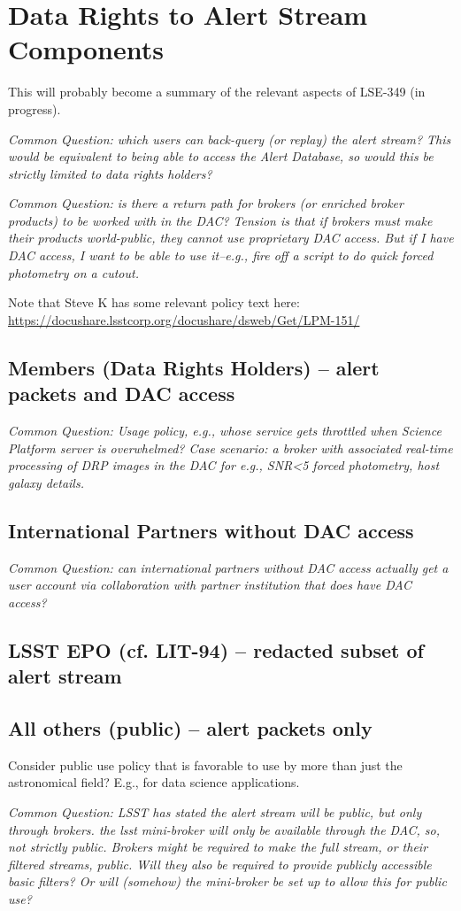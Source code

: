 \section{Data Rights to Alert Stream Components}\label{sec:data_rights}

This will probably become a summary of the relevant aspects of LSE-349 (in progress). 

{\it Common Question: which users can back-query (or replay) the alert stream? This would be equivalent to being able to access the Alert Database, so would this be strictly limited to data rights holders?}

{\it Common Question: is there a return path for brokers (or enriched broker products) to be worked with in the DAC?  Tension is that if brokers must make their products world-public, they cannot use proprietary DAC access.  But if I have DAC access, I want to be able to use it--e.g., fire off a script to do quick forced photometry on a cutout.}

Note that Steve K has some relevant policy text here:
\url{https://docushare.lsstcorp.org/docushare/dsweb/Get/LPM-151/}


\subsection{Members (Data Rights Holders) -- alert packets and DAC access}

{\it Common Question: Usage policy, e.g., whose service gets throttled when Science Platform server is overwhelmed? Case scenario: a broker with associated real-time processing of DRP images in the DAC for e.g., SNR<5 forced photometry, host galaxy details.}

\subsection{International Partners without DAC access}

{\it Common Question: can international partners without DAC access actually get a user account via collaboration with partner institution that does have DAC access?}

\subsection{LSST EPO (cf. LIT-94) -- redacted subset of alert stream}

\subsection{All others (public) -- alert packets only}

Consider public use policy that is favorable to use by more than just the astronomical field? E.g., for data science applications.

{\it Common Question: LSST has stated the alert stream will be public, but only through brokers. the lsst mini-broker will only be available through the DAC, so, not strictly public. Brokers might be required to make the full stream, or their filtered streams, public. Will they also be required to provide publicly accessible basic filters? Or will (somehow) the mini-broker be set up to allow this for public use?}